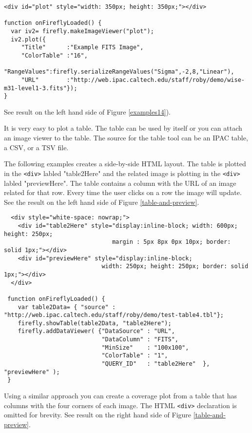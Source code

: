 
\scriptsize
\begin{verbatim}
<div id="plot" style="width: 350px; height: 350px;"></div>

function onFireflyLoaded() {
  var iv2= firefly.makeImageViewer("plot");
  iv2.plot({   
     "Title"      :"Example FITS Image",
     "ColorTable" :"16",
     "RangeValues":firefly.serializeRangeValues("Sigma",-2,8,"Linear"),
     "URL"        :"http://web.ipac.caltech.edu/staff/roby/demo/wise-m31-level1-3.fits"});
}
\end{verbatim}
See result on the left hand side of Figure \ref{examples14}).
        
It is very easy to plot a table. The table can be used by itself or you can attach an image viewer to the table. The source for the table tool can be an IPAC table, a CSV, or a TSV file. 

The following examples creates a side-by-side HTML layout.  The table is plotted in the \scriptsize\texttt{<div>} \normalsize labled "table2Here" and the related image is plotting in the \scriptsize\texttt{<div>} \normalsize labled "previewHere". The table contains a column with the URL of an image related for that row. Every time the user clicks on a row the image will update. See the result on the left hand side of Figure \ref{table-and-preview}.

\scriptsize
\begin{verbatim}
  <div style="white-space: nowrap;">
    <div id="table2Here" style="display:inline-block; width: 600px; height: 250px; 
                               margin : 5px 8px 0px 10px; border: solid 1px;"></div>
    <div id="previewHere" style="display:inline-block;
                            width: 250px; height: 250px; border: solid 1px;"></div>
  </div>

 function onFireflyLoaded() {
    var table2Data= { "source" : "http://web.ipac.caltech.edu/staff/roby/demo/test-table4.tbl"};
    firefly.showTable(table2Data, "table2Here");
    firefly.addDataViewer( {"DataSource" : "URL",
                            "DataColumn" : "FITS",
                            "MinSize"    : "100x100",
                            "ColorTable" : "1",
                            "QUERY_ID"   : "table2Here"  }, "previewHere" );
 }
\end{verbatim}
\normalsize


Using a similar approach you can create a coverage plot from a table that has columns with the four corners of each image. The HTML \scriptsize\texttt{<div>} \normalsize declaration is omitted for brevity. See result on the right hand side of Figure \ref{table-and-preview}.
\normalsize

